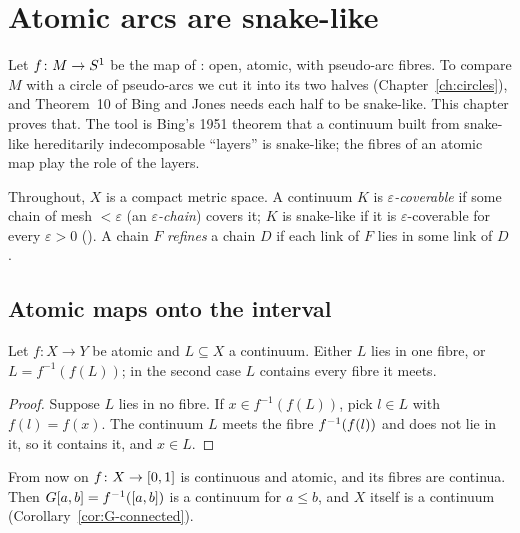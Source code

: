 \chapter{Atomic arcs are snake-like}\label{ch:atomic}

Let $f\colon M\to S^1$ be the map of : open, atomic, with pseudo-arc fibres. To compare $M$ with a circle of pseudo-arcs we cut it
into its two halves (Chapter~\ref{ch:circles}), and Theorem~10 of Bing and Jones needs each half to be snake-like. This chapter proves that. The tool
is Bing's 1951 theorem that a continuum built from snake-like hereditarily indecomposable ``layers'' is snake-like; the fibres of an atomic map play the
role of the layers.

Throughout, $X$ is a compact metric space. A continuum $K$ is \emph{$\varepsilon$-coverable} if some chain of mesh $<\varepsilon$ (an
\emph{$\varepsilon$-chain}) covers it; $K$ is snake-like if it is $\varepsilon$-coverable for every $\varepsilon>0$ (). A chain $F$
\emph{refines} a chain $D$ if each link of $F$ lies in some link of $D$.


\section{Atomic maps onto the interval}

\begin{lemma}[Saturation]\label{lem:saturation}
Let $f\colon X\to Y$ be atomic and $L\subseteq X$ a continuum. Either $L$ lies in one fibre, or $L=f^{-1}(f(L))$; in the second case $L$ contains every
fibre it meets.
\end{lemma}

\begin{proof}
Suppose $L$ lies in no fibre. If $x\in f^{-1}(f(L))$, pick $l\in L$ with $f(l)=f(x)$. The continuum $L$ meets the fibre $f^{-1}(f(l))$ and does not lie in
it, so it contains it, and $x\in L$.
\end{proof}


From now on $f\colon X\to[0,1]$ is continuous and atomic, and its fibres are continua. Then $G[a,b]=f^{-1}([a,b])$ is a continuum for $a\le b$, and $X$ itself is
a continuum (Corollary~\ref{cor:G-connected}).

